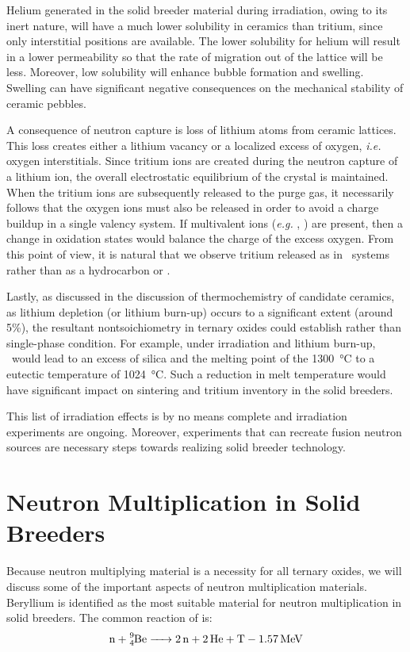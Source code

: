 \documentclass[11pt]{report} %
\newcommand{\lis}{\ce{Li4SiO4}}
\newcommand{\lio}{\ce{Li2O}}
\begin{document}
Helium generated in the solid breeder material during irradiation, owing to its inert nature, will have a much lower solubility in ceramics than tritium, since only interstitial positions are available. The lower solubility for helium will result in a lower permeability so that the rate of migration out of the lattice will be less. Moreover, low solubility will enhance bubble formation and swelling. Swelling can have significant negative consequences on the mechanical stability of ceramic pebbles.

A consequence of neutron capture is loss of lithium atoms from ceramic lattices. This loss creates either a lithium vacancy or a localized excess of oxygen, \textit{i.e.} oxygen interstitials. Since tritium ions are created during the neutron capture of a lithium ion, the overall electrostatic equilibrium of the crystal is maintained. When the tritium ions are subsequently released to the purge gas, it necessarily follows that the oxygen ions must also be released in order to avoid a charge buildup in a single valency system. If multivalent ions (\textit{e.g.} , ) are present, then a change in oxidation states would balance the charge of the excess oxygen. From this point of view, it is natural that we observe tritium released as  in \lio~systems rather than as a hydrocarbon or .\cite{Johnson1981}

Lastly, as discussed in the discussion of thermochemistry of candidate ceramics, as lithium depletion (or lithium burn-up) occurs to a significant extent (around 5\%), the resultant nontsoichiometry in ternary oxides could establish rather than single-phase condition. For example, under irradiation and lithium burn-up, \lis~would lead to an excess of silica and the melting point of the \SI{1300}{\celsius} to a eutectic temperature of \SI{1024}{\celsius}. Such a reduction in melt temperature would have significant impact on sintering and tritium inventory in the solid breeders.\cite{Johnson1981}

This list of irradiation effects is by no means complete and irradiation experiments are ongoing.\cite{vanderLaan200099} Moreover, experiments that can recreate fusion neutron sources are necessary steps towards realizing solid breeder technology.\cite{Abdou1996d}

\section{Neutron Multiplication in Solid Breeders}
Because neutron multiplying material is a necessity for all ternary oxides, we will discuss some of the important aspects of neutron multiplication materials. Beryllium is identified as the most suitable material for neutron multiplication in solid breeders. The common reaction of  is:
\begin{align}
\ce{n + ^9_4Be -> 2n + 2He + T}-\SI{1.57}{\mega\electronvolt}\label{eq:Be-n}
\end{align}
\end{document}

